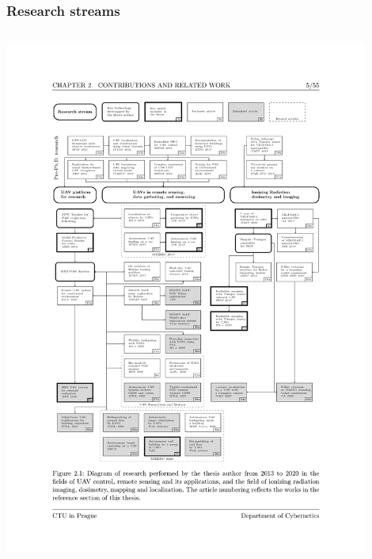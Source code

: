 \documentclass[aspectratio=169]{beamer}
\begin{document}
\begin{frame}
\frametitle{Research streams}

\begin{columns}[c]


\centering

\includegraphics[width=0.9\textwidth,trim={2.0cm 5.0cm 2.5cm 5.2cm},clip]{./fig/pubgraph_january.pdf}

\centering



\end{columns}
\end{frame}
\end{document}
